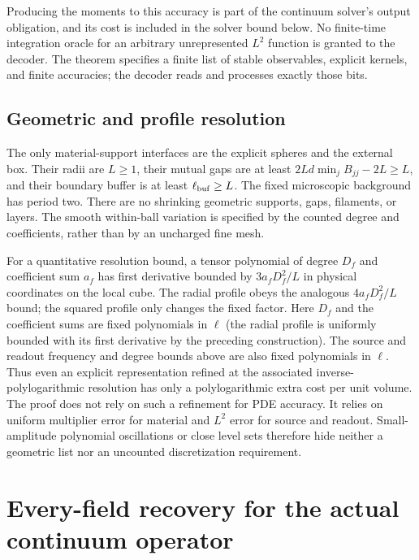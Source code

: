 Producing the moments to this accuracy is part of the continuum
solver's output obligation, and its cost is included in the solver
bound below. No finite-time integration oracle for an arbitrary
unrepresented $L^2$ function is granted to the decoder. The theorem
specifies a finite list of stable observables, explicit kernels, and
finite accuracies; the decoder reads and processes exactly those bits.

\subsection{Geometric and profile resolution}
The only material-support interfaces are the explicit spheres and the
external box. Their radii are $L\ge1$, their mutual gaps are at least
$2Ld\min_j B_{jj}-2L\ge L$, and their boundary buffer is at least
$\ell_{\rm buf}\ge L$. The fixed microscopic background has period two. There
are no shrinking geometric supports, gaps, filaments, or layers.
The smooth within-ball variation is specified by the counted degree
and coefficients, rather than by an uncharged fine mesh.

For a quantitative resolution bound, a tensor polynomial of degree $D_f$
and coefficient sum $a_f$ has first derivative bounded by $3a_fD_f^2/L$
in physical coordinates on the local cube. The radial profile obeys
the analogous $4a_fD_f^2/L$ bound; the squared profile only changes the
fixed factor. Here $D_f$ and the coefficient sums are fixed polynomials
in $\ell$ (the radial profile is uniformly bounded with its first
derivative by the preceding construction). The source and readout
frequency and degree bounds above are also fixed polynomials in
$\ell$. Thus even an explicit representation refined at the associated
inverse-polylogarithmic resolution has only a polylogarithmic extra
cost per unit volume. The proof does not rely on such a refinement
for PDE accuracy. It relies on uniform multiplier error for material
and $L^2$ error for source and readout. Small-amplitude polynomial
oscillations or close level sets therefore hide neither a geometric
list nor an uncounted discretization requirement.

\section{Every-field recovery for the actual continuum operator}
\label{c:sec:recovery}

